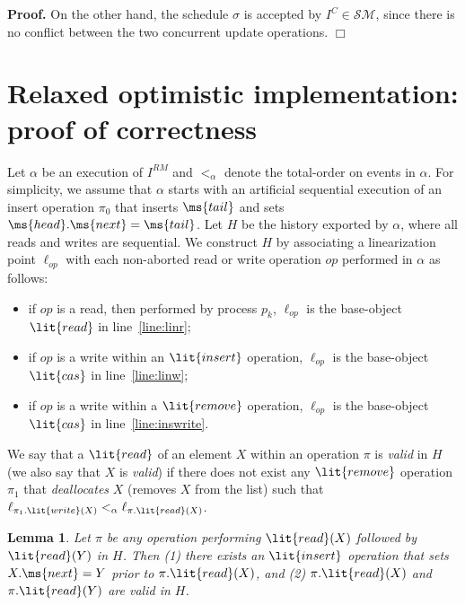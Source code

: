 \documentclass[11pt,pdftex,letterpaper]{article}
\newtheorem{lemma}[theorem]{Lemma}
\newenvironment{proof}[1][Proof]{\noindent\textbf{#1.} }{\hfill $\Box$\\[2mm]}
\begin{document}
\begin{proof}
On the other hand, the schedule $\sigma$ is accepted by $I^{C}\in \mathcal{SM}$, since
there is no conflict between the two concurrent update operations.
\end{proof}





\section{Relaxed optimistic implementation: proof of correctness}
\label{app:lltm}
Let $\alpha$ be an execution of $I^{RM}$ and $<_\alpha$
denote the total-order on events in $\alpha$.
For simplicity, we assume that $\alpha$ starts with an artificial
sequential execution of an insert operation $\pi_0$ that inserts $\ms{tail}$ and sets $\ms{head}.\ms{next}=\ms{tail}$. 
Let $H$ be the history exported by $\alpha$, where 
all reads and writes are sequential. 
We construct $H$ by associating a linearization point $\ell_{op}$ with each
non-aborted read or write operation $op$ performed in $\alpha$  
as follows:
\begin{itemize}
\item  if $op$ is a read, then performed by process $p_k$,
  $\ell_{op}$ is the base-object $\lit{read}$ in line~\ref{line:linr};
\item  if $op$ is a write within an $\lit{insert}$ operation,
  $\ell_{op}$ is the base-object $\lit{cas}$ in line~\ref{line:linw};
\item  if $op$ is a write  within a $\lit{remove}$ operation,
  $\ell_{op}$ is the base-object  $\lit{cas}$ in line~\ref{line:inswrite}.
\end{itemize}
We say that a $\lit{read}$ of an element $X$ within an operation $\pi$
is \emph{valid} in $H$ 
(we also say that $X$ is \emph{valid}) if 
there does not exist any $\lit{remove}$ operation $\pi_1$ that \emph{deallocates} $X$ (removes $X$ from the list)
such that $\ell_{\pi_1.\lit{write}(X)} <_{\alpha}
\ell_{\pi.\lit{read}(X)}$. 
\begin{lemma}
\label{lem:invar1}
Let $\pi$ be any operation performing $\lit{read}(X)$ followed by $\lit{read}(Y)$ in $H$. 
Then (1) there exists an $\lit{insert}$ operation that sets $X.\ms{next}=Y$ prior to $\pi.\lit{read}(X)$, and
(2) $\pi.\lit{read}(X)$ and $\pi.\lit{read}(Y)$ are \emph{valid} in $H$.
\end{lemma}
\end{document}
